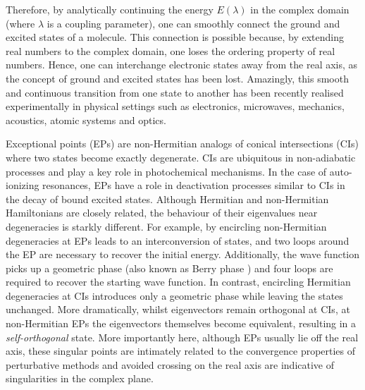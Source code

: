 \documentclass[aps,prb,reprint,noshowkeys,superscriptaddress]{revtex4-1}
\begin{document}
Therefore, by analytically continuing the energy $E(\lambda)$ in the complex domain (where $\lambda$ is a coupling parameter), one can smoothly connect the ground and excited states of a molecule.
This connection is possible because, by extending real numbers to the complex domain, one loses the ordering property of real numbers.
Hence, one can interchange electronic states away from the real axis, as the concept of ground and excited states has been lost.
Amazingly, this smooth and continuous transition from one state to another has been recently realised experimentally in physical settings such as electronics, microwaves, mechanics, acoustics, atomic systems and optics. \cite{Bittner_2012, Chong_2011, Chtchelkatchev_2012, Doppler_2016, Guo_2009, Hang_2013, Liertzer_2012, Longhi_2010, Peng_2014, Peng_2014a, Regensburger_2012, Ruter_2010, Schindler_2011, Szameit_2011, Zhao_2010, Zheng_2013, Choi_2018, El-Ganainy_2018}


Exceptional points (EPs) \cite{Heiss_1990, Heiss_1999, Heiss_2012, Heiss_2016} are non-Hermitian analogs of conical intersections (CIs) \cite{Yarkony_1996} where two states become exactly degenerate.
CIs are ubiquitous in non-adiabatic processes and play a key role in photochemical mechanisms.
In the case of auto-ionizing resonances, EPs have a role in deactivation processes similar to CIs in the decay of bound excited states.
Although Hermitian and non-Hermitian Hamiltonians are closely related, the behaviour of their eigenvalues near degeneracies is starkly different.
For example, by encircling non-Hermitian degeneracies at EPs leads to an interconversion of states, and two loops around the EP are necessary to recover the initial energy.
Additionally, the wave function picks up a geometric phase (also known as Berry phase \cite{Berry_1984}) and four loops are required to recover the starting wave function.
In contrast, encircling Hermitian degeneracies at CIs introduces only a geometric phase while leaving the states unchanged.
More dramatically, whilst eigenvectors remain orthogonal at CIs, at non-Hermitian EPs the eigenvectors themselves become equivalent, resulting in a \textit{self-orthogonal} state. \cite{MoiseyevBook}
More importantly here, although EPs usually lie off the real axis, these singular points are intimately related to the convergence properties of perturbative methods and avoided crossing on the real axis are indicative of singularities in the complex plane. \cite{Olsen_1996, Olsen_2000}


\end{document}
